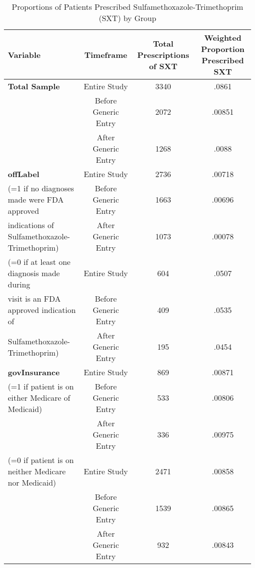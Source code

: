 \begin{table}[htbp]\centering
\def\sym#1{\ifmmode^{#1}\else\(^{#1}\)\fi}
\caption{Proportions of Patients Prescribed Sulfamethoxazole-Trimethoprim (SXT) by Group\label{tab1}}
\begin{tabular}{l*{3}{c}}
\hline\hline
            Variable&\multicolumn{1}{c}{Timeframe}&\multicolumn{1}{c}{Total Prescriptions of SXT}&\multicolumn{1}{c}{Weighted Proportion Prescribed SXT}\\
\hline
\textbf{Total Sample}                                   &     Entire Study&             3340&     .0861\\
                                                        &     Before Generic Entry&    2072&     .00851\\
                                                        &     After Generic Entry&      1268&     .0088\\
[1em]
\textbf{offLabel}                                       &     Entire Study&             2736&     .00718\\
(=1 if no diagnoses made were FDA approved         &     Before Generic Entry&    1663&     .00696\\
indications of Sulfamethoxazole-Trimethoprim)  &     After Generic Entry&      1073&     .00078\\
[1em]
(=0 if at least one diagnosis made during               &     Entire Study&             604&     .0507\\
visit is an FDA approved indication of                  &     Before Generic Entry&    409&     .0535\\
Sulfamethoxazole-Trimethoprim)                          &     After Generic Entry&      195&     .0454\\
[1em]
\textbf{govInsurance}                                   &     Entire Study&             869&     .00871\\
(=1 if patient is on either Medicare of Medicaid)       &     Before Generic Entry&     533 &     .00806\\
                                                        &     After Generic Entry&      336 &     .00975\\
[1em]
(=0 if patient is on neither Medicare nor Medicaid)     &     Entire Study&             2471&     .00858\\
                                                        &     Before Generic Entry&     1539 &     .00865\\
                                                        &     After Generic Entry&      932 &     .00843\\

\end{tabular}
\end{table}
